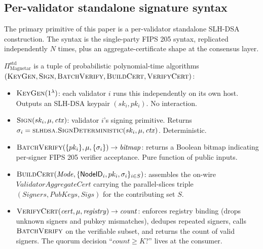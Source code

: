 \subsection{Per-validator standalone signature syntax}
\label{sec:prelim:standalone-syntax}

The primary primitive of this paper is a per-validator standalone
SLH-DSA construction. The syntax is the single-party FIPS 205 syntax,
replicated independently $N$ times, plus an aggregate-certificate
shape at the consensus layer.

\begin{definition}
\label{def:standalone-syntax}
$\Pi_{\mathrm{Magnetar}}^{\mathrm{std}}$ is a tuple of probabilistic
polynomial-time algorithms
$(\textsc{KeyGen}, \textsc{Sign}, \textsc{BatchVerify},
\textsc{BuildCert}, \textsc{VerifyCert})$:
\begin{itemize}[nosep,leftmargin=2em]
  \item $\textsc{KeyGen}(1^\lambda)$: each validator $i$ runs this
        independently on its own host. Outputs an SLH-DSA keypair
        $(sk_i, pk_i)$. No interaction.
  \item $\textsc{Sign}(sk_i, \mu, \mathit{ctx})$: validator $i$'s
        signing primitive. Returns
        $\sigma_i = \textsc{slhdsa.SignDeterministic}(sk_i, \mu,
        \mathit{ctx})$. Deterministic.
  \item $\textsc{BatchVerify}(\{pk_i\}, \mu, \{\sigma_i\}) \to
        \mathit{bitmap}$: returns a Boolean bitmap indicating
        per-signer FIPS 205 verifier acceptance. Pure function of
        public inputs.
  \item $\textsc{BuildCert}(\mathit{Mode},
        \{\mathsf{NodeID}_i, pk_i, \sigma_i\}_{i \in S})$: assembles
        the on-wire $\mathit{ValidatorAggregateCert}$ carrying the
        parallel-slices triple $(\mathit{Signers},
        \mathit{PubKeys}, \mathit{Sigs})$ for the contributing
        set $S$.
  \item $\textsc{VerifyCert}(\mathit{cert}, \mu, \mathit{registry})
        \to \mathit{count}$: enforces registry binding (drops
        unknown signers and pubkey mismatches), dedupes
        repeated signers, calls
        $\textsc{BatchVerify}$ on the verifiable subset, and
        returns the count of valid signers. The quorum decision
        ``$\mathit{count} \ge K$?'' lives at the consumer.
\end{itemize}
\end{definition}

